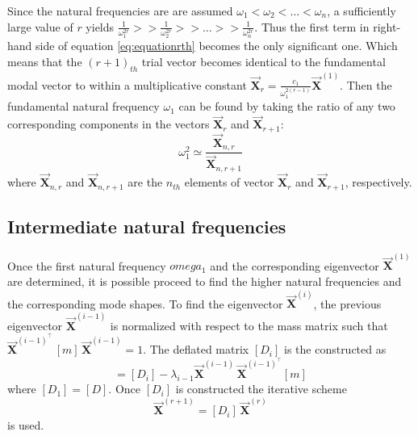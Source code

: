 Since the natural frequencies are are assumed \(\omega_1 < \omega_2 < \dots <
\omega_n\), a sufficiently large value of \(r\) yields \(\frac{1}{\omega_1^{2r}}
>> \frac{1}{\omega_2^{2r}} >> \dots >> \frac{1}{\omega_n^{2r}}\). Thus the first
term in right-hand side of equation \eqref{eq:equationrth} becomes the only
significant one.
Which means that the \((r+1)_{th}\) trial vector becomes identical to the
fundamental modal vector to within a multiplicative constant
\(\vec{\mathbf{X}}_{r} = \frac{c_1}{\omega^{2(r-1)}_{1}}\vec{\mathbf{X}}^{(1)}\).
Then the fundamental natural frequency \(\omega_1\) can be found by taking the
ratio of any two corresponding components in the vectors \(\vec{\mathbf{X}}_{r}\)
and \(\vec{\mathbf{X}}_{r+1}\):
\begin{equation}
  \omega_1^{2} \simeq \frac{\vec{\mathbf{X}}_{n,r}}{\vec{\mathbf{X}}_{n,r+1}}
\end{equation}
where \(\vec{\mathbf{X}}_{n,r}\) and \(\vec{\mathbf{X}}_{n,r+1}\) are the
\(n_{th}\) elements of vector \(\vec{\mathbf{X}}_{r}\) and
\(\vec{\mathbf{X}}_{r+1}\), respectively.
\subsection{Intermediate natural frequencies}
Once the first natural frequency \(omega_1\) and the corresponding eigenvector
\(\vec{\mathbf{X}}^{(1)}\) are determined, it is possible proceed to find the
higher natural frequencies and the corresponding mode shapes.
To find the eigenvector \(\vec{\mathbf{X}}^{(i)}\), the previous eigenvector
\(\vec{\mathbf{X}}^{(i-1)}\) is normalized with respect to the mass matrix such
that \(\vec{\mathbf{X}}^{(i-1)^\top}\,[m]\,\vec{\mathbf{X}}^{(i-1)} = 1\).
The deflated matrix \([D_i]\) is the constructed as
\begin{equation}
  [D_i] =
  [D_i] - \lambda_{i-1}\vec{\mathbf{X}}^{(i-1)}\,\vec{\mathbf{X}}^{(i-1)^\top}[m]
\end{equation}
where \([D_1] = [D]\).
Once \([D_i]\) is constructed the iterative scheme
\begin{equation}
  \vec{\mathbf{X}}^{(r+1)} = [D_i]\,\vec{\mathbf{X}}^{(r)}
\end{equation}
is used.
